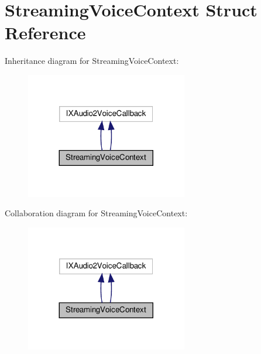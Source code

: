 \hypertarget{structStreamingVoiceContext}{}\section{Streaming\+Voice\+Context Struct Reference}
\label{structStreamingVoiceContext}


Inheritance diagram for Streaming\+Voice\+Context\+:
\nopagebreak
\begin{figure}[H]
\begin{center}
\leavevmode
\includegraphics[width=200pt]{structStreamingVoiceContext__inherit__graph}
\end{center}
\end{figure}


Collaboration diagram for Streaming\+Voice\+Context\+:
\nopagebreak
\begin{figure}[H]
\begin{center}
\leavevmode
\includegraphics[width=200pt]{structStreamingVoiceContext__coll__graph}
\end{center}
\end{figure}
